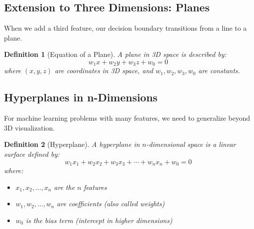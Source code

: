 \documentclass[12pt,a4paper]{article}
\theoremstyle{directpoint}
\newtheorem*{definition}{Definition}
\theoremstyle{definition}
\begin{document}
\subsection{Extension to Three Dimensions: Planes}

When we add a third feature, our decision boundary transitions from a line to a plane.

\begin{definition}[Equation of a Plane]
A plane in 3D space is described by:
\begin{equation}
w_1x + w_2y + w_3z + w_0 = 0
\end{equation}
where $(x, y, z)$ are coordinates in 3D space, and $w_1, w_2, w_3, w_0$ are constants.
\end{definition}

\begin{center}
\end{center}

\subsection{Hyperplanes in n-Dimensions}

For machine learning problems with many features, we need to generalize beyond 3D visualization.

\begin{definition}[Hyperplane]
A hyperplane in $n$-dimensional space is a linear surface defined by:
\begin{equation}
w_1x_1 + w_2x_2 + w_3x_3 + \cdots + w_nx_n + w_0 = 0
\end{equation}
where:
\begin{itemize}
    \item $x_1, x_2, \ldots, x_n$ are the $n$ features
    \item $w_1, w_2, \ldots, w_n$ are coefficients (also called weights)
    \item $w_0$ is the bias term (intercept in higher dimensions)
\end{itemize}
\end{definition}
\end{document}
